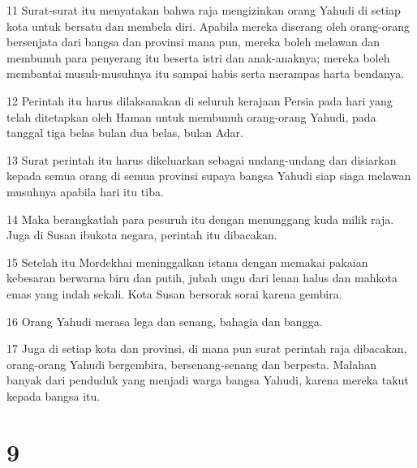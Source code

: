 \par 11 Surat-surat itu menyatakan bahwa raja mengizinkan orang Yahudi di setiap kota untuk bersatu dan membela diri. Apabila mereka diserang oleh orang-orang bersenjata dari bangsa dan provinsi mana pun, mereka boleh melawan dan membunuh para penyerang itu beserta istri dan anak-anaknya; mereka boleh membantai musuh-musuhnya itu sampai habis serta merampas harta bendanya.
\par 12 Perintah itu harus dilaksanakan di seluruh kerajaan Persia pada hari yang telah ditetapkan oleh Haman untuk membunuh orang-orang Yahudi, pada tanggal tiga belas bulan dua belas, bulan Adar.
\par 13 Surat perintah itu harus dikeluarkan sebagai undang-undang dan disiarkan kepada semua orang di semua provinsi supaya bangsa Yahudi siap siaga melawan musuhnya apabila hari itu tiba.
\par 14 Maka berangkatlah para pesuruh itu dengan menunggang kuda milik raja. Juga di Susan ibukota negara, perintah itu dibacakan.
\par 15 Setelah itu Mordekhai meninggalkan istana dengan memakai pakaian kebesaran berwarna biru dan putih, jubah ungu dari lenan halus dan mahkota emas yang indah sekali. Kota Susan bersorak sorai karena gembira.
\par 16 Orang Yahudi merasa lega dan senang, bahagia dan bangga.
\par 17 Juga di setiap kota dan provinsi, di mana pun surat perintah raja dibacakan, orang-orang Yahudi bergembira, bersenang-senang dan berpesta. Malahan banyak dari penduduk yang menjadi warga bangsa Yahudi, karena mereka takut kepada bangsa itu.

\chapter{9}

